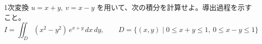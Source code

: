 
1次変換 $u = x + y,\ v = x - y$ を用いて、次の積分を計算せよ。導出過程を示すこと。
\[
I = \iint_{D} (x^{2} - y^{2})\, e^{x+y}\, dx\, dy, \qquad D = \{(x,y) \mid 0 \le x+y \le 1,\ 0 \le x-y \le 1\}
\]
